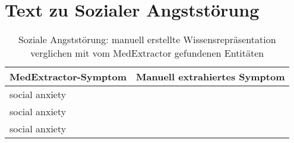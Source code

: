 \section{Text zu Sozialer Angststörung}
\label{sec:socialanxiety} 

\begin{table}[H]
\begin{center}
\begin{tabular}{ll}
\toprule
  MedExtractor-Symptom &                       Manuell extrahiertes Symptom \\
\midrule
     social anxiety &                  \\
      social anxiety &                  \\
      social anxiety &                  \\
\bottomrule
\end{tabular}
\caption{Soziale Angststörung: manuell erstellte Wissensrepräsentation verglichen mit vom MedExtractor gefundenen Entitäten}
\label{tab:socialanxiety_vergleich_manuell_medextractor}
\end{center}
\end{table}


